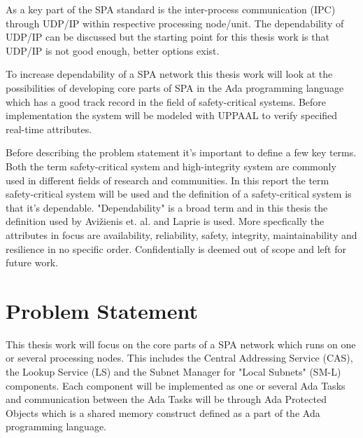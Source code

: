 As a key part of the SPA standard is the inter-process communication (IPC)
through UDP/IP within respective processing node/unit. The dependability of
UDP/IP can be discussed but the starting point for this thesis work is that
UDP/IP is not good enough, better options exist.


To increase dependability of a SPA network this thesis work will look at the
possibilities of developing core parts of SPA in the Ada programming language
which has a good track record in the field of safety-critical systems. Before
implementation the system will be modeled with UPPAAL to verify specified
real-time attributes.

Before describing the problem statement it's important to define a few key
terms. Both the term safety-critical system and high-integrity system are
commonly used in different fields of research and communities. In this report
the term safety-critical system will be used and the definition of a
safety-critical system is that it's dependable.  "Dependability" is a broad
term and in this thesis the definition used by Avi\v{z}ienis et. al.
\cite{avizienis2004} and Laprie \cite{laprie2008} is used. More specfically the
attributes in focus are availability, reliability, safety, integrity,
maintainability and resilience in no specific order.  Confidentially is deemed
out of scope and left for future work.

\section{Problem Statement}



This thesis work will focus on the core parts of a SPA network which runs on
one or several processing nodes. This includes the Central Addressing Service
(CAS), the Lookup Service (LS) and the Subnet Manager for "Local Subnets"
(SM-L) components. Each component will be implemented as one or several Ada
Tasks and communication between the Ada Tasks will be through Ada Protected
Objects which is a shared memory construct defined as a part of the Ada
programming language.

